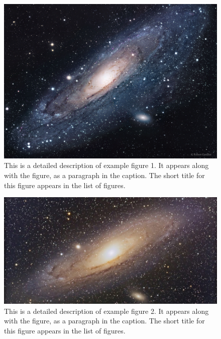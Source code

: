 \documentclass[twoside,openany]{thesis}
\begin{document}
\begin{figure}[p]
    \begin{center}
        \includegraphics[scale=0.075]{examplefigure1.jpg}
    \end{center}
    \caption[Short title for example figure 1]{
        This is a detailed description of example figure 1.
        It appears along with the figure, as a paragraph in the caption.
        The short title for this figure appears in the list of figures.
    }
    \label{fig:examplefigure1}
\end{figure}

\begin{figure}[p]
    \begin{center}
        \includegraphics[scale=0.2]{examplefigure2.jpg}
    \end{center}
    \caption[Short title for example figure 2]{
        This is a detailed description of example figure 2.
        It appears along with the figure, as a paragraph in the caption.
        The short title for this figure appears in the list of figures.
    }
    \label{fig:examplefigure2}
\end{figure}
\end{document}
